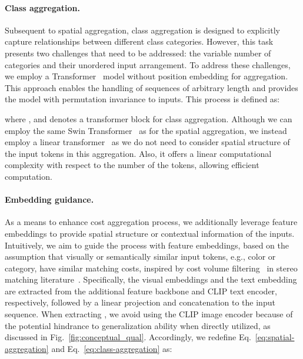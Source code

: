 \documentclass[10pt,twocolumn,letterpaper]{article}
\begin{document}
\vspace{-10pt}
\paragraph{Class aggregation.}
Subsequent to spatial aggregation, class aggregation is designed to explicitly capture relationships between different class categories. However, this task presents two challenges that need to be addressed: the variable number of categories  and their unordered input arrangement. To address these challenges, we employ a Transformer~\cite{vaswani2017attention} model without position embedding for aggregation.
This approach enables the handling of sequences of arbitrary length and provides the model with permutation invariance to inputs. This process is defined as: 

where , and  denotes a transformer block for class aggregation. Although we can employ the same Swin Transformer~\cite{liu2021swin} as for the spatial aggregation, we instead employ a linear transformer~\cite{katharopoulos2020transformers} as we do not need to consider spatial structure of the input tokens in this aggregation. Also, it offers a linear computational complexity with respect to the number of the tokens, allowing efficient computation. 

\vspace{-10pt}
\paragraph{Embedding guidance.}
As a means to enhance cost aggregation process, we additionally leverage feature embeddings to provide spatial structure or contextual information of the inputs. Intuitively, we aim to guide the process with feature embeddings, based on the assumption that visually or semantically similar input tokens, e.g., color or category, have similar matching costs, inspired by cost volume filtering~\cite{hosni2012fast,sun2018pwc} in stereo matching literature~\cite{scharstein2002taxonomy}.
Specifically, the visual embeddings  and the text embedding  are extracted from the additional feature backbone and CLIP text encoder, respectively, followed by a linear projection and concatenation to the input sequence. When extracting , we avoid using the CLIP image encoder because of the potential hindrance to generalization ability when directly utilized, as discussed in Fig.~\ref{fig:conceptual_qual}. Accordingly, we redefine Eq.~\ref{eq:spatial-aggregation} and Eq.~\ref{eq:class-aggregation} as:  
\end{document}
